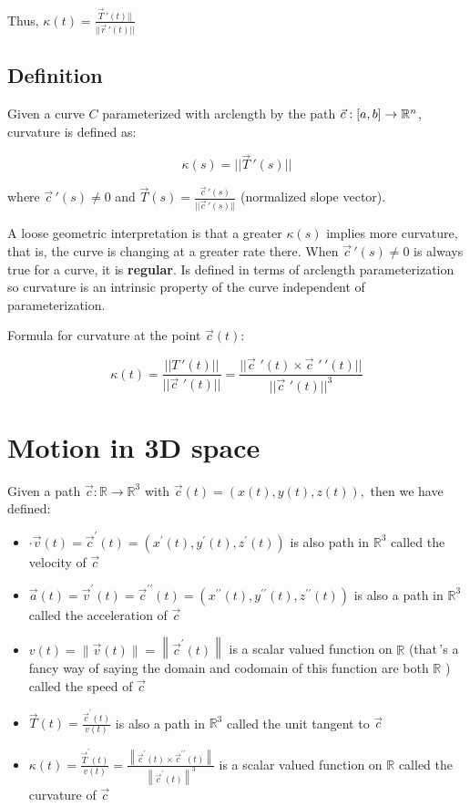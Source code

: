 Thus, $\boxed{\kappa(t)=\frac{\vec{T}\,'(t)||}{||\vec{r}\,'(t)||}}$

\subsection{Definition}

Given a curve $C$ parameterized with arclength by the path $\vec{c}:[a,b]\rightarrow \mathbb{R}^n$,
curvature is defined as:

\[\boxed{\kappa(s)=||\vec{T}\,'(s)||}\]

where $\vec{c}\,'(s)\neq 0$ and $\vec{T}(s)=\frac{\vec{c}\,'(s)}{||\vec{c}\,'(s)||}$ (normalized slope vector).\newline

A loose geometric interpretation is that a greater $\kappa(s)$ implies
more curvature, that is, the curve is changing at a greater rate there.
When $\vec{c}\,'(s)\neq 0$ is always true for a curve, it is \textbf{regular}.
Is defined in terms of arclength parameterization so curvature
is an intrinsic property of the curve independent of parameterization.\newline

\noindent
Formula for curvature at the point $\vec{c}(t)$:

\[\boxed{\kappa(t)=\frac{||T\,'(t)||}{||\vec{c}\,\,'(t)||}=\frac{||\vec{c}\,\,'(t)\times \vec{c}\,\,'\,'(t)||}{||\vec{c}\,\,'(t)||^3}}\]

\section{Motion in 3D space}

Given a path $\vec{c}: \mathbb{R} \rightarrow \mathbb{R}^{3}$ with $\vec{c}(t)=(x(t), y(t), z(t)),$ then we have defined:
\begin{itemize}
    \item $\cdot \vec{v}(t)=\vec{c}^{\prime}(t)=\left(x^{\prime}(t), y^{\prime}(t), z^{\prime}(t)\right)$ is also path in $\mathbb{R}^{3}$ called the velocity of $\vec{c}$
    \item $\vec{a}(t)=\vec{v}^{\prime}(t)=\vec{c}^{\prime \prime}(t)=\left(x^{\prime \prime}(t), y^{\prime \prime}(t), z^{\prime \prime}(t)\right)$ is also a path in $\mathbb{R}^{3}$ called the acceleration of $\vec{c}$
    \item $v(t)=\|\vec{v}(t)\|=\left\|\vec{c}^{\prime}(t)\right\|$ is a scalar valued function on $\mathbb{R}$ (that\,'s a fancy way of saying the domain and codomain of this function are both $\mathbb{R}$ ) called the speed of $\vec{c}$
    \item $\vec{T}(t)=\frac{\vec{c}^{\prime}(t)}{v(t)}$ is also a path in $\mathbb{R}^{3}$ called the unit tangent to $\vec{c}$
    \item $\kappa(t)=\frac{\vec{T}^{\prime}(t)}{v(t)}=\frac{\left\|\vec{c}^{\prime}(t) \times \vec{c}^{\prime \prime}(t)\right\|}{\left\|\vec{c}^{\prime}(t)\right\|^{3}}$ is a scalar valued function on $\mathbb{R}$ called the curvature of $\vec{c}$
\end{itemize}

